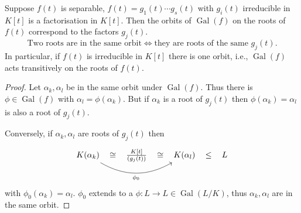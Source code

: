 \documentclass{article}
\DeclareMathOperator{\Gal}{Gal}
\begin{document}
\begin{nlemma}\label{lem:3.6}
    Suppose $f(t)$ is separable, $f(t) = g_1(t) \dotsm g_s(t)$ with $g_i(t)$ irreducible in $K[t]$ is a factorisation in $K[t]$.
    Then the orbits of $\Gal(f)$ on the roots of $f(t)$ correspond to the factors $g_j(t)$.
    \begin{equation*}
        \text{Two roots are in the same orbit} \iff \text{they are roots of the same } g_j(t).
    \end{equation*}
    In particular, if $f(t)$ is irreducible in $K[t]$ there is one orbit, i.e., $\Gal(f)$ acts transitively on the roots of $f(t)$.
\end{nlemma}
\begin{proof}
    Let $\alpha_k, \alpha_l$ be in the same orbit under $\Gal(f)$.
    Thus there is $\phi \in \Gal(f)$ with $\alpha_l = \phi(\alpha_k)$.
    But if $\alpha_k$ is a root of $g_j(t)$ then $\phi(\alpha_k) = \alpha_l$ is also a root of $g_j(t)$.

    Conversely, if $\alpha_k, \alpha_l$ are roots of $g_j(t)$ then
    \begin{equation*}
        \begin{tikzcd}
            K(\alpha_k) \rar[phantom,"\cong"] \ar[rr,bend right, "\phi_0"'] & \frac{K[t]}{(g_j(t))} \rar[phantom,"\cong"] & K(\alpha_l) \rar[phantom,"\leq"]& L
        \end{tikzcd}
    \end{equation*}
    with $\phi_0(\alpha_k) = \alpha_l$.
    $\phi_0$ extends to a $\phi:L \to L \in \Gal(L/K)$, thus $\alpha_k, \alpha_l$ are in the same orbit.
\end{proof}
\end{document}
